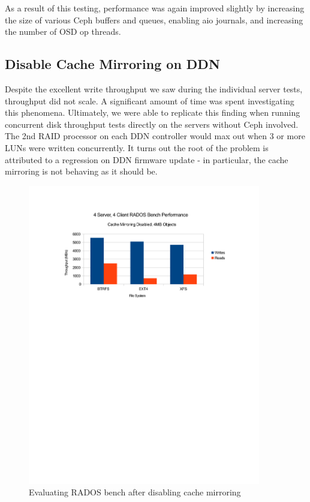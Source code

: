\documentclass{article}
\begin{document}
As a result of this testing, performance was again improved slightly by
increasing the size of various Ceph buffers and queues, enabling aio journals,
and increasing the number of OSD op threads.


\subsection{Disable Cache Mirroring on DDN}


Despite the excellent write throughput we saw during the individual server
tests, throughput did not scale.  A significant amount of time was spent
investigating this phenomena. Ultimately, we were able to replicate this finding
when running concurrent disk throughput tests directly on the servers without
Ceph involved. The 2nd RAID processor on each DDN controller would max out when
3 or more LUNs were written concurrently. It turns out the root of the problem
is attributed to a regression on DDN firmware update - in particular, the cache
mirroring is not behaving as it should be. 


\begin{figure}[htb]
\centering
\includegraphics[width=4in]{rados-after-ddn}
\caption{Evaluating RADOS bench after disabling cache mirroring}
\label{fig:rados-ddn-mirror-disabled}
\end{figure}
\end{document}
